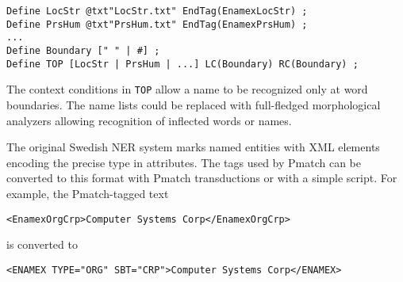 \documentclass{llncs}
\begin{document}
\begin{verbatim}
Define LocStr @txt"LocStr.txt" EndTag(EnamexLocStr) ;
Define PrsHum @txt"PrsHum.txt" EndTag(EnamexPrsHum) ;
...
Define Boundary [" " | #] ;
Define TOP [LocStr | PrsHum | ...] LC(Boundary) RC(Boundary) ;
\end{verbatim}

\noindent
The context conditions in \texttt{TOP} allow a name to be recognized
only at word boundaries. The name lists could be replaced with
full-fledged morphological analyzers allowing recognition
of inflected words or names.



The original Swedish NER system marks named entities with XML elements
encoding the precise type in attributes. The tags used by Pmatch can
be converted to this format with Pmatch transductions or with a simple
script. For example, the Pmatch-tagged text
%
\begin{verbatim}
<EnamexOrgCrp>Computer Systems Corp</EnamexOrgCrp>
\end{verbatim}
is converted to
\begin{verbatim}
<ENAMEX TYPE="ORG" SBT="CRP">Computer Systems Corp</ENAMEX>
\end{verbatim}
\end{document}
